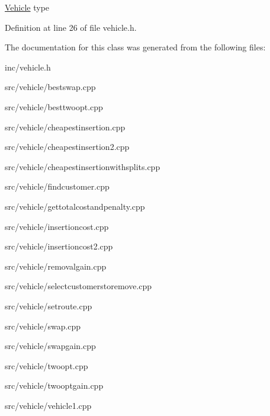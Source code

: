 \hyperlink{class_vehicle}{Vehicle} type 

Definition at line 26 of file vehicle.\+h.



The documentation for this class was generated from the following files\+:\begin{DoxyCompactItemize}
\item 
inc/vehicle.\+h\item 
src/vehicle/bestswap.\+cpp\item 
src/vehicle/besttwoopt.\+cpp\item 
src/vehicle/cheapestinsertion.\+cpp\item 
src/vehicle/cheapestinsertion2.\+cpp\item 
src/vehicle/cheapestinsertionwithsplits.\+cpp\item 
src/vehicle/findcustomer.\+cpp\item 
src/vehicle/gettotalcostandpenalty.\+cpp\item 
src/vehicle/insertioncost.\+cpp\item 
src/vehicle/insertioncost2.\+cpp\item 
src/vehicle/removalgain.\+cpp\item 
src/vehicle/selectcustomerstoremove.\+cpp\item 
src/vehicle/setroute.\+cpp\item 
src/vehicle/swap.\+cpp\item 
src/vehicle/swapgain.\+cpp\item 
src/vehicle/twoopt.\+cpp\item 
src/vehicle/twooptgain.\+cpp\item 
src/vehicle/vehicle1.\+cpp\end{DoxyCompactItemize}
